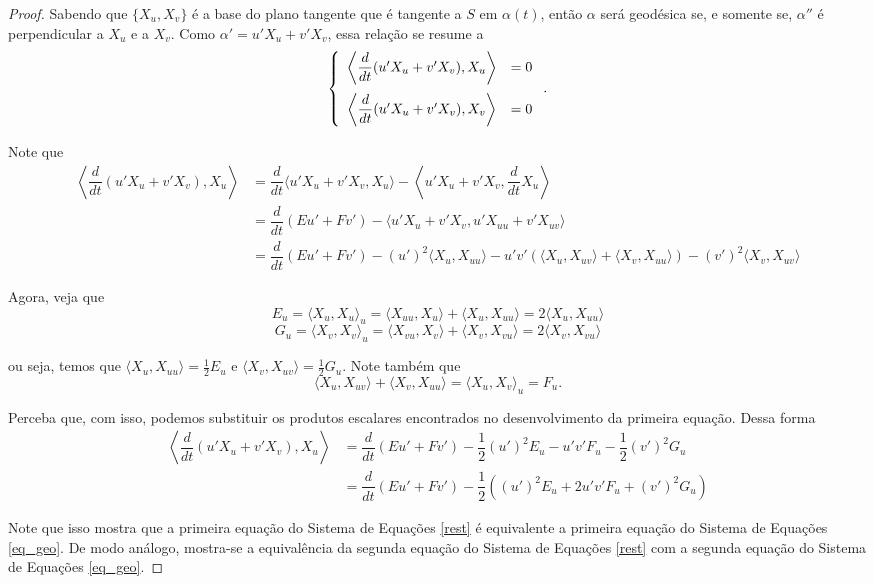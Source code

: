 \documentclass{article}
\begin{document}
\begin{proof}
    Sabendo que $\{X_u, X_v\}$ é a base do plano tangente que é tangente a $S$ em $\alpha(t)$, então $\alpha$ será geodésica se, e somente se, $\alpha''$ é perpendicular a $X_u$ e a $X_v$. Como $\alpha' = u' X_u + v' X_v$, essa relação se resume a
    \begin{equation}
        \label{rest}
        \left\{\begin{array}{cc}
            \left\langle \dfrac{d}{dt}(u' X_u + v' X_v), X_u\right\rangle & = 0 \vspace{6pt}\\
            \left\langle \dfrac{d}{dt}(u' X_u + v' X_v), X_v\right\rangle & = 0
        \end{array}\right..
    \end{equation}
    
    Note que
    \begin{align*}
        \left\langle \dfrac{d}{dt}(u' X_u + v' X_v), X_u\right\rangle & = \dfrac{d}{dt}\langle u' X_u + v' X_v, X_u\rangle - \left\langle u' X_u + v' X_v, \dfrac{d}{dt}X_u\right\rangle \\
        & = \dfrac{d}{dt}(Eu' + Fv') - \langle u' X_u + v' X_v, u' X_{uu} + v' X_{uv}\rangle \\
        & = \dfrac{d}{dt}(Eu' + Fv') - (u')^2\langle X_u, X_{uu}\rangle - u'v'(\langle X_u, X_{uv}\rangle + \langle X_v, X_{uu}\rangle) - (v')^2\langle X_v, X_{uv}\rangle
    \end{align*}
    
    Agora, veja que
    \[E_u = \langle X_u, X_u\rangle_u = \langle X_{uu}, X_u\rangle + \langle X_u, X_{uu}\rangle = 2\langle X_u, X_{uu}\rangle\]
    \[G_u = \langle X_v, X_v\rangle_u = \langle X_{vu}, X_v\rangle + \langle X_v, X_{vu}\rangle = 2\langle X_v, X_{vu}\rangle\]
    
    \noindent ou seja, temos que $\langle X_u, X_{uu}\rangle = \frac{1}{2}E_u$ e $\langle X_v, X_{uv}\rangle = \frac{1}{2}G_u$. Note também que
    \[\langle X_u, X_{uv}\rangle + \langle X_v, X_{uu}\rangle = \langle X_u, X_v\rangle_u = F_u.\]
    
    Perceba que, com isso, podemos substituir os produtos escalares encontrados no desenvolvimento da primeira equação. Dessa forma
    \begin{align*}
        \left\langle \dfrac{d}{dt}(u' X_u + v' X_v), X_u\right\rangle & = \dfrac{d}{dt}(Eu' + Fv') - \dfrac{1}{2}(u')^2E_u - u'v'F_u - \dfrac{1}{2}(v')^2G_u \\
        & = \dfrac{d}{dt}(Eu' + Fv') - \dfrac{1}{2}\left((u')^2E_u + 2u'v'F_u + (v')^2G_u\right)
    \end{align*}
    
    Note que isso mostra que a primeira equação do Sistema de Equações \ref{rest} é equivalente a primeira equação do Sistema de Equações \ref{eq_geo}. De modo análogo, mostra-se a equivalência da segunda equação do Sistema de Equações \ref{rest} com a segunda equação do Sistema de Equações \ref{eq_geo}.
\end{proof}
\end{document}
